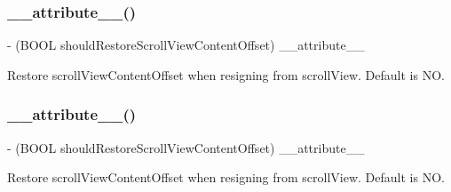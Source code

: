 \subsubsection{\texorpdfstring{\+\_\+\+\_\+attribute\+\_\+\+\_\+()}{\_\_attribute\_\_()}\hspace{0.1cm}{\footnotesize\ttfamily [1/3]}}
{\footnotesize\ttfamily -\/ (B\+O\+OL should\+Restore\+Scroll\+View\+Content\+Offset) \+\_\+\+\_\+attribute\+\_\+\+\_\+ \begin{DoxyParamCaption}\item[{((deprecated(\char`\"{}Please use I\+Q\+U\+I\+Scroll\+View+Additions category instead. This property will be removed from here in future release.\char`\"{})))}]{ }\end{DoxyParamCaption}}

Restore scroll\+View\+Content\+Offset when resigning from scroll\+View. Default is NO. \mbox{\label{interface_i_q_keyboard_manager_a5b51f290fc063aed13cea8483e6f7060}} 
\subsubsection{\texorpdfstring{\+\_\+\+\_\+attribute\+\_\+\+\_\+()}{\_\_attribute\_\_()}\hspace{0.1cm}{\footnotesize\ttfamily [2/3]}}
{\footnotesize\ttfamily -\/ (B\+O\+OL should\+Restore\+Scroll\+View\+Content\+Offset) \+\_\+\+\_\+attribute\+\_\+\+\_\+ \begin{DoxyParamCaption}\item[{((deprecated(\char`\"{}Please use I\+Q\+U\+I\+Scroll\+View+Additions category instead. This property will be removed from here in future release.\char`\"{})))}]{ }\end{DoxyParamCaption}}

Restore scroll\+View\+Content\+Offset when resigning from scroll\+View. Default is NO. \mbox{\label{interface_i_q_keyboard_manager_a5b51f290fc063aed13cea8483e6f7060}} 
